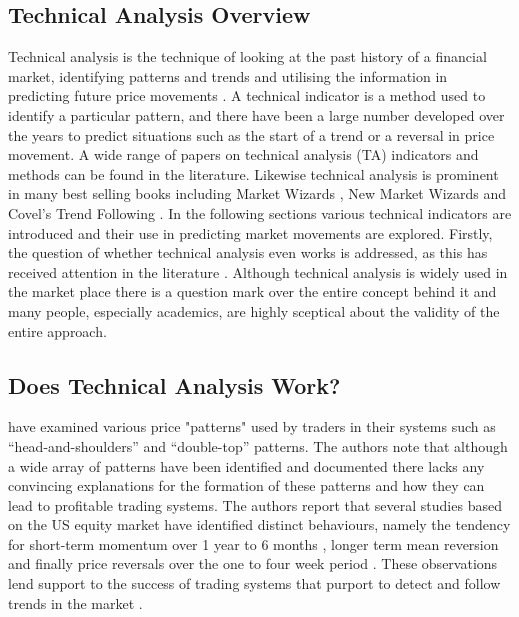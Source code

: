 \subsection{Technical Analysis Overview}
Technical analysis is the technique of looking at the past history of a financial market, identifying patterns and trends and utilising the information in predicting future price movements \citep{bulkowski2011encyclopedia}. A technical indicator is a method used to identify a particular pattern, and there have been a large number developed over the years to predict situations such as the start of a trend or a reversal in price movement.  A wide range of papers on technical analysis (TA) indicators and methods can be found in the literature. Likewise technical analysis is prominent in many best selling books including Market Wizards \citep{schwager2012market}, New Market Wizards \citep{schwager2012new} and Covel's Trend Following \citep{covel2009trend}. In the following sections various technical indicators are introduced and their use in predicting market movements are explored. Firstly, the question of whether technical analysis even works is addressed, as this has received attention in the literature \citep{Marshall2005,Reitz2006121,Schulmeister2009190,Marshall2008199}.  Although technical analysis is widely used in the market place there is a question mark over the entire concept behind it and many people, especially academics, are highly sceptical about the validity of the entire approach.

\subsection{Does Technical Analysis Work?}

\cite{Friesen20091089} have examined various price "patterns" used by traders in their systems such as \textquotedblleft head-and-shoulders” and \textquotedblleft double-top” patterns. The authors note that although a wide array of patterns have been identified and documented there lacks any convincing explanations for the formation of these patterns and how they can lead to profitable trading systems.  The authors report that several studies based on the US equity market have identified distinct behaviours, namely the tendency for short-term momentum over 1 year to 6 months \citep{Bondt,chopra1992,jegadeesh1993}, longer term mean reversion and finally price reversals over the one to four week period \citep{jegadeesh1990,lehmann1990,jegadeesh1995,kelley2008}. These observations lend support to the success of trading systems that purport to detect and follow trends in the market \citep{sweeney182,levich1993,neely1997,Dueker2007}.

